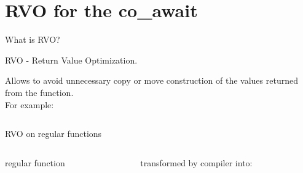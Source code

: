 \documentclass[10pt]{beamer}
\begin{document}
\section{RVO for the co\_await}

\begin{frame}{What is RVO?}
\centerline{\alert{RVO} - Return Value Optimization.}

\vfill

Allows to avoid unnecessary copy or move construction of the values returned from the function. \\
\pause
For example:

\vfill

\inputminted{c++}{code-examples/RVO_examples/example.cpp}

\end{frame}

\begin{frame}[fragile]{RVO on regular functions}

\begin{columns}[T]
\begin{column}{0.4\linewidth}
\centerline{regular function}
\vfill
\inputminted{c++}{code-examples/RVO_examples/regular_function_rvo.cpp}
\vfill
\end{column}
\begin{column}{0.55\linewidth}
\centerline{transformed by compiler into:}
\vfill
\inputminted{c++}{code-examples/RVO_examples/transformed_function_rvo.cpp}
\vfill
\end{column}
\end{columns}

\end{frame}
\end{document}
